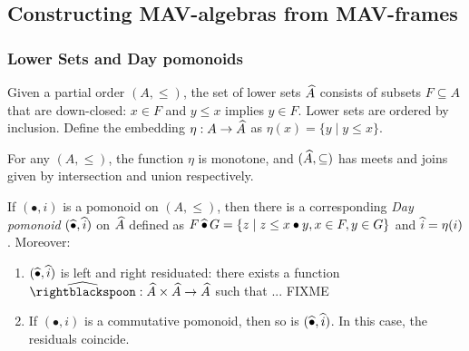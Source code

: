 \begin{remark}
\end{remark}

\begin{proposition}
\end{proposition}

\subsection{Constructing MAV-algebras from MAV-frames}


\subsubsection{Lower Sets and Day pomonoids}

\begin{definition}
  Given a partial order $(A, \leq)$, the set of lower sets
  $\widehat{A}$ consists of subsets $F \subseteq A$ that are
  down-closed: $x \in F$ and $y \leq x$ implies $y \in F$. Lower sets
  are ordered by inclusion. Define the embedding
  $\eta : A \to \widehat{A}$ as $\eta(x) = \{ y \mid y \leq x \}$.
\end{definition}

\begin{proposition}
  For any $(A, \leq)$, the function $\eta$ is monotone, and
  $(\widehat{A}, \subseteq)$ has meets and joins given by
  intersection and union respectively.

\end{proposition}

\begin{proposition}\label{prop:day-construction}
  If $(\bullet, i)$ is a pomonoid on $(A, \leq)$, then there is a
  corresponding \emph{Day pomonoid} $(\mathop{\widehat{\bullet}}, \mathop{\widehat{i}})$ on
  $\widehat{A}$ defined as
  $F \mathop{\widehat{\bullet}} G = \{ z \mid z \leq x \bullet y, x \in F, y \in G
    \}$ and $\mathop{\widehat{i}} = \eta(i)$. Moreover:
  \begin{enumerate}
    \item $(\mathop{\widehat{\bullet}}, \mathop{\widehat{i}})$ is left and right residuated: there
          exists a function
          $\Day{\rightblackspoon} : \LowerSet{A} \times \LowerSet{A} \to
            \LowerSet{A}$ such that ... FIXME
    \item If $(\bullet, i)$ is a commutative pomonoid, then so is
          $(\mathop{\widehat{\bullet}}, \mathop{\widehat{i}})$. In this case, the residuals coincide.
  \end{enumerate}
\end{proposition}

